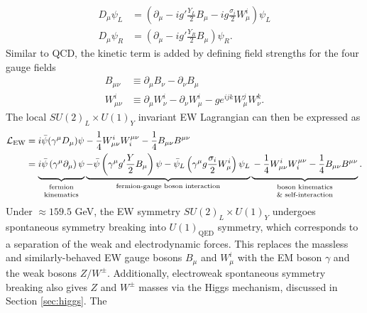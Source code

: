 \documentclass[../thesis.tex]{subfiles}
\begin{document}
\begin{equation}
\begin{aligned}
\label{eq:EW_cov}
D_\mu \psi_L &= \left( \partial_\mu - ig'\frac{Y_L}{2}B_\mu - ig\frac{\sigma_i}{2}W_\mu^i \right) \psi_L \\
D_\mu \psi_R &= \left( \partial_\mu - ig'\frac{Y_R}{2}B_\mu \right) \psi_R.
\end{aligned}
\end{equation}
Similar to \acs{QCD}, the kinetic term is added by defining field strengths for the four gauge fields
\begin{equation}
\begin{aligned}
B_{\mu \nu}   &\equiv \partial_\mu B_\nu - \partial_\nu B_\mu \\
W_{\mu \nu}^i &\equiv \partial_\mu W^i_\nu - \partial_\nu W^i_\mu - g e^{ijk} W^j_\mu W^k_\nu.
\end{aligned}
\end{equation}
The local $SU(2)_L \times U(1)_Y$ invariant \acs{EW} Lagrangian can then be expressed as
\begin{equation}
\begin{aligned}
\mathcal{L}_\text{EW} &= i\bar{\psi}(\gamma^\mu D_\mu)\psi - \frac{1}{4}W^i_{\mu\nu}W_i^{\mu\nu} - \frac{1}{4}B_{\mu\nu}B^{\mu\nu} \\
&= \underbrace{\vphantom{\left(\frac{Y}{2}\right)}
i\bar{\psi}\left(\gamma^\mu\partial_\mu\right)\psi
}_{\substack{\text{fermion}\vphantom{\frac{1}{4}}\\ \text{kinematics}}}
\underbrace{
-\bar{\psi}\left(\gamma^\mu g'\frac{Y}{2}B_\mu\right)\psi - \bar{\psi}_L\left(\gamma^\mu g\frac{\sigma_i}{2}W_\mu^i\right)\psi_L
}_\text{fermion-gauge boson interaction}
\underbrace{\vphantom{\left(\frac{Y}{2}\right)}
-\frac{1}{4}W^i_{\mu\nu}W_i^{\mu\nu} - \frac{1}{4}B_{\mu\nu}B^{\mu\nu}
}_{\substack{\text{boson kinematics}\vphantom{\frac{1}{4}}\\ \text{\& self-interaction}}}.
\end{aligned}
\end{equation}
Under $\approx 159.5$ GeV, the \acs{EW} symmetry $SU(2)_L\times U(1)_Y$ undergoes spontaneous symmetry breaking into $U(1)_\text{QED}$ symmetry, which corresponds to a separation of the weak and electrodynamic forces. This replaces the massless and similarly-behaved \acs{EW} gauge bosons $B_\mu$ and $W_\mu^i$ with the \acs{EM} boson $\gamma$ and the weak bosons $Z/W^\pm$. Additionally, electroweak spontaneous symmetry breaking also gives $Z$ and $W^\pm$ masses via the Higgs mechanism, discussed in Section \ref{sec:higgs}. The 
\end{document}
